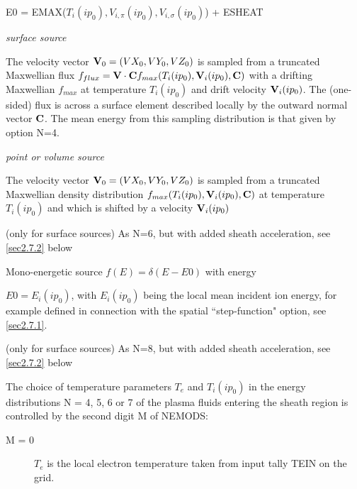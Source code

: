 \begin{description}
\begin{description}
                E0 = EMAX($T_i(ip_0),V_{i,\pi}(ip_0),V_{i,\sigma}(ip_0)$) + ESHEAT
          \item[N = 6]

                \emph{surface source} 

                The velocity vector $\mathbf{V}_0 = (VX_0,VY_0,VZ_0)$ is sampled from a truncated
                Maxwellian flux $f_{flux}= \mathbf{V} \cdot \mathbf{C} f_{max} (T_i(ip_0),\mathbf{V}_i(ip_0), \mathbf{C} )$
                with a drifting Maxwellian $f_{max}$ at temperature $ T_i(ip_0) $ and drift
                velocity $\mathbf{V}_i(ip_0) $.
                The (one-sided) flux is across a surface element described locally by the
                outward normal vector $\mathbf{C} $.
                The mean energy from this sampling distribution is that given by option N=4.

                \emph{point or volume source} 

                The velocity vector $\mathbf{V}_0 = (VX_0,VY_0,VZ_0)$ is sampled from a truncated
                Maxwellian density distribution $f_{max} (T_i(ip_0),\mathbf{V}_i(ip_0), \mathbf{C} )$ at
                temperature $ T_i(ip_0) $ and which is shifted by a velocity $\mathbf{V}_i(ip_0) $

          \item[N = 7] (only for surface sources) As N=6, but with added sheath
                acceleration, see \cref{sec2.7.2} below 

          \item[N = 8] Mono-energetic source $f(E) = \delta (E-E0)$ with energy

                $E0 = E_i(ip_0)$, with $E_i(ip_0)$ being the local mean incident ion energy,
                for example defined in connection with the spatial ``step-function" option, see
                \cref{sec2.7.1}.
          \item[N = 9] (only for surface sources) As N=8, but with added sheath
                acceleration, see \cref{sec2.7.2} below
        \end{description}
        The choice of
        temperature parameters $T_e$ and $T_i(ip_0)$ in the energy distributions N = 4,
        5, 6 or 7 of the plasma fluids entering the sheath region is controlled by the
        second digit M of NEMODS:
        \begin{description}
          \item[M = 0] $T_e$ is the local electron temperature taken from input tally
                TEIN on the grid.


\end{description}
\end{description}
